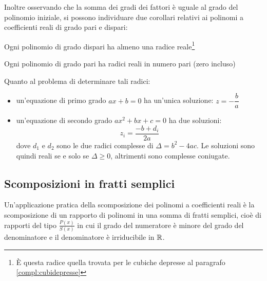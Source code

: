 Inoltre osservando che la somma dei gradi dei fattori è uguale al grado del polinomio iniziale, si possono individuare due corollari relativi ai polinomi a coefficienti reali di grado pari e dispari:
\begin{corol}
	Ogni polinomio di grado dispari ha almeno una radice reale\footnote{È questa radice quella trovata per le cubiche depresse al paragrafo \ref{compl:cubidepresse}}
\end{corol}
\begin{corol}
	Ogni polinomio di grado pari ha radici reali in numero pari (zero incluso)
\end{corol}
Quanto al problema di determinare tali radici:
\begin{itemize}
	\item un'equazione di primo grado $ax+b=0$ ha un'unica soluzione: $z=-\dfrac{b}{a}$
	\item un'equazione di secondo grado $ax^2+bx+c=0$ ha due soluzioni:
	      \[
		      z_i=\frac{-b+d_i}{2a}
	      \]
	      dove $d_1$ e $d_2$ sono le due radici complesse di $\Delta=b^2-4ac$. Le soluzioni sono quindi reali se e solo se $\Delta\geq0$, altrimenti sono complesse coniugate.
\end{itemize}

\subsection{Scomposizioni in fratti semplici}
\label{frattisemplici}
Un'applicazione pratica della scomposizione dei polinomi a coefficienti reali è la scomposizione di un rapporto di polinomi in una somma di fratti semplici, cioè di rapporti del tipo $\frac{P(x)}{S(x)}$ in cui il grado del numeratore è minore del grado del denominatore e il denominatore è irriducibile in $\mathbb{R}$.

